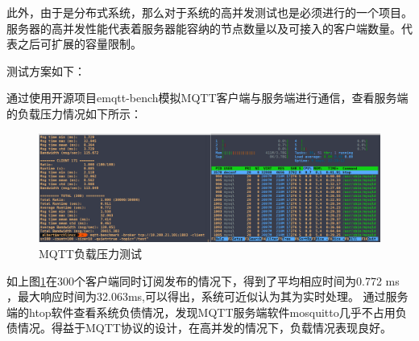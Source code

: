 此外，由于是分布式系统，那么对于系统的高并发测试也是必须进行的一个项目。服务器的高并发性能代表着服务器能容纳的节点数量以及可接入的客户端数量。代表之后可扩展的容量限制。

测试方案如下：

通过使用开源项目emqtt-bench模拟MQTT客户端与服务端进行通信，查看服务端的负载压力情况如下所示：


\begin{figure}[H]
	\centering
	\includegraphics[width=0.85\linewidth]{figure/test-4}
	\caption{MQTT负载压力测试}
	\label{fig:6-4}
\end{figure}

如上图\ref{fig:6-4}在300个客户端同时订阅发布的情况下，得到了平均相应时间为0.772 ms
，最大响应时间为32.063ms,可以得出，系统可近似认为其为实时处理。
通过服务端的htop软件查看系统负债情况，发现MQTT服务端软件mosquitto几乎不占用负债情况。得益于MQTT协议的设计，在高并发的情况下，负载情况表现良好。